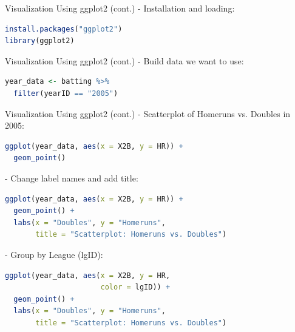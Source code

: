 \documentclass{beamer}
\begin{document}
\begin{frame}[fragile]{Visualization Using ggplot2 (cont.)}
- Installation and loading:
\begin{lstlisting}[language=R]
install.packages("ggplot2")
library(ggplot2)
\end{lstlisting}
\end{frame}

\begin{frame}[fragile]{Visualization Using ggplot2 (cont.)}
- Build data we want to use:
\begin{lstlisting}[language=R]
year_data <- batting %>% 
  filter(yearID == "2005")
\end{lstlisting}
\end{frame}

\begin{frame}[fragile]{Visualization Using ggplot2 (cont.)}
- Scatterplot of Homeruns vs. Doubles in 2005:
\begin{lstlisting}[language=R]
ggplot(year_data, aes(x = X2B, y = HR)) +
  geom_point()
\end{lstlisting}

- Change label names and add title:
\begin{lstlisting}[language=R]
ggplot(year_data, aes(x = X2B, y = HR)) +
  geom_point() +
  labs(x = "Doubles", y = "Homeruns", 
       title = "Scatterplot: Homeruns vs. Doubles")
\end{lstlisting}

- Group by League (lgID):
\begin{lstlisting}[language=R]
ggplot(year_data, aes(x = X2B, y = HR,
                      color = lgID)) +
  geom_point() +
  labs(x = "Doubles", y = "Homeruns", 
       title = "Scatterplot: Homeruns vs. Doubles")
\end{lstlisting}
\end{frame}
\end{document}

